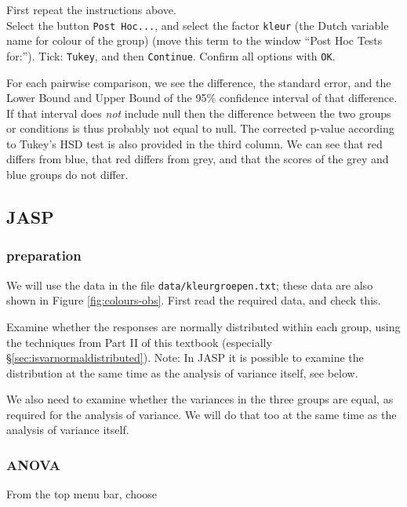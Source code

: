 \documentclass[
]{book}
\begin{document}
First repeat the instructions above.\\
Select the button \texttt{Post\ Hoc...}, and select the factor \texttt{kleur}
(the Dutch variable name for colour of the group) (move this term to the window ``Post Hoc Tests for:'').
Tick: \texttt{Tukey}, and then \texttt{Continue}. Confirm all options with \texttt{OK}.

For each pairwise comparison, we see the difference, the
standard error, and the Lower Bound and Upper Bound of the 95\%
confidence interval of that difference. If that interval does \emph{not}
include null then the difference between the two groups or conditions is
thus probably not equal to null. The corrected p-value according to Tukey's
HSD test is also provided in the third column. We can see that red
differs from blue, that red differs from grey, and that the scores of the
grey and blue groups do not differ.

\hypertarget{jasp-13}{%
\subsection{JASP}\label{jasp-13}}

\hypertarget{preparation-2}{%
\subsubsection{preparation}\label{preparation-2}}

We will use the data in the file \texttt{data/kleurgroepen.txt}; these data are also shown in Figure \ref{fig:colours-obs}.
First read the required data, and check this.

Examine whether the responses are normally distributed within each group, using the
techniques from Part II of this textbook (especially
§\ref{sec:isvarnormaldistributed}).
Note: In JASP it is possible to examine the distribution at the same time as the analysis of variance itself, see below.

We also need to examine whether the variances in the three groups
are equal, as required for the analysis of variance. We will do that too at the same
time as the analysis of variance itself.

\hypertarget{anova-1}{%
\subsubsection{ANOVA}\label{anova-1}}

From the top menu bar, choose
\end{document}
